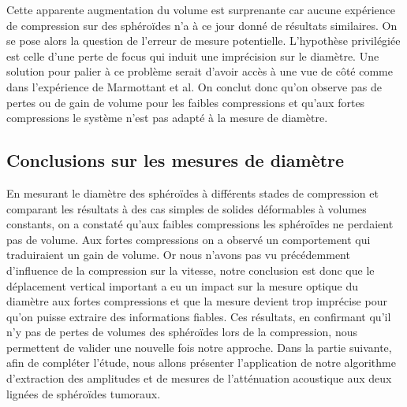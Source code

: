 Cette apparente augmentation du volume est surprenante car aucune expérience de compression sur des sphéroïdes n'a à ce jour donné de résultats similaires.\cite{Marmottant2009} \cite{Delarue2014} On se pose alors la question de l'erreur de mesure potentielle. L'hypothèse privilégiée est celle d'une perte de focus qui induit une imprécision sur le diamètre. %
 Une solution pour palier à ce problème  serait d'avoir accès à une vue de côté comme dans l'expérience de Marmottant et al. On conclut donc qu'on observe pas de pertes ou de gain de volume pour les faibles compressions et qu'aux fortes compressions le système n'est pas adapté à la mesure de diamètre. 


\subsection{Conclusions sur les mesures de diamètre}
En mesurant le diamètre des sphéroïdes à différents stades de compression et comparant les résultats à des cas simples de solides déformables à volumes constants, on a constaté qu'aux faibles compressions les sphéroïdes ne perdaient pas de volume. Aux fortes compressions on a observé un comportement qui traduiraient un gain de volume. Or nous n'avons pas vu précédemment d'influence de la compression sur la vitesse, notre conclusion est donc que le déplacement vertical important a eu un impact sur la mesure optique du diamètre aux fortes compressions et que la mesure devient trop imprécise pour qu'on puisse extraire des informations fiables. Ces résultats, en confirmant qu'il n'y pas de pertes de volumes des sphéroïdes lors de la compression, nous permettent de valider une nouvelle fois notre approche. Dans la partie suivante, afin de compléter l'étude, nous allons présenter l'application de notre algorithme d'extraction des amplitudes et de mesures de l'atténuation acoustique aux deux lignées de sphéroïdes tumoraux. 

